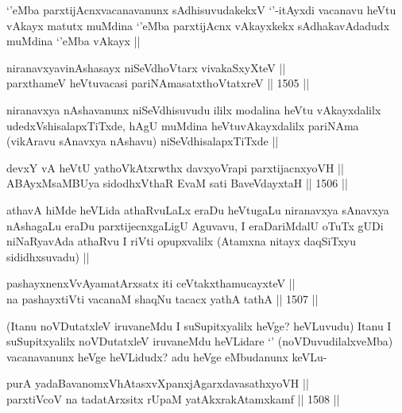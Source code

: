 \begin{artha}
`\stext'eMba parxtijAcnxvacanavanunx sAdhisuvudakekxV `\stext'-itAyxdi vacanavu heVtu vAkayx matutx muMdina `\stext'eMba parxtijAcnx vAkayxkekx sAdhakavAdadudx muMdina `\stext'eMba vAkayx ||
\end{artha}


\begin{shl}
niranavxyavinAshasayx niSeVdhoV\s tarx vivakaSxyXteV ||  \\
parxthameV heVtuvacasi pariNAmasatxthoVtatxreV ||  1505 ||  
\end{shl}

\begin{artha}
niranavxya nAshavanunx niSeVdhisuvudu ililx modalina heVtu vAkayxdalilx udedxVshisalapxTiTxde, hAgU muMdina heVtuvAkayxdalilx pariNAma (vikAravu sAnavxya nAshavu) niSeVdhisalapxTiTxde ||
\end{artha}


\begin{shl}
devxY vA heVtU yathoVkAtxrwthx davxyoVrapi parxtijacnxyoVH || \\
ABAyxMsaMBUya sidodhxV\s thaR EvaM sati BaveVdayxtaH ||  1506 ||  
\end{shl}

\begin{artha}
athavA hiMde heVLida athaRvuLaLx eraDu heVtugaLu niranavxya sAnavxya nAshagaLu eraDu parxtijecnxgaLigU Aguvavu, I eraDariMdalU oTuTx gUDi niNaRyavAda athaRvu I riVti opupxvalilx (Atamxna nitayx daqSiTxyu sididhxsuvadu) ||
\end{artha}

\begin{shl}
pashayxnenxVvAyamatArx\s \s satx iti ceVtakxthamucayxteV || \\
na pashayxtiVti vacanaM shaqNu tacacx yathA tathA ||  1507 ||  
\end{shl}

\begin{artha}
(Itanu noVDutatxleV iruvaneMdu I suSupitxyalilx heVge? heVLuvudu) Itanu I suSupitxyalilx noVDutatxleV iruvaneMdu heVLidare `\stext' (noVDuvudilalxveMba) vacanavanunx heVge heVLidudx? adu heVge eMbudanunx keVLu-
\end{artha}


\begin{shl}
purA yadaBavanomxVhAtasxvXpanxjAgarxdavasathxyoVH || \\
parxtiVcoV na tadatArxsitx rUpaM yatAkxrakAtamxkamf ||  1508 ||  
\end{shl}

